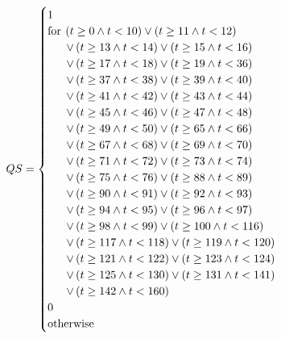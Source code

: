 \documentclass[10pt,journal]{IEEEtran}
\begin{document}
\begin{equation}
 \begin{minipage}{250pt}
\begin{flushleft} $\displaystyle QS = \begin{cases} 1 & \\  \text{for}\: \left(t \geq 0 \wedge t < 10\right) \vee \left(t \geq 11 \wedge t < 12 \right) \\ \quad \ \  \vee \left(t \geq 13 \wedge t < 14\right) \vee \left(t \geq 15 \wedge t < 16 \right) \\ \quad \ \  \vee \left(t \geq 17 \wedge t < 18\right) \vee \left(t \geq 19 \wedge t < 36\right) \\ \quad \ \  \vee \left(t \geq 37 \wedge t < 38\right) \vee \left(t \geq 39 \wedge t < 40\right) \\ \quad \ \  \vee \left(t \geq 41 \wedge t < 42\right) \vee \left(t \geq 43 \wedge t < 44\right) \\ \quad \ \  \vee \left(t \geq 45 \wedge t < 46\right) \vee \left(t \geq 47 \wedge t < 48\right) \\ \quad \ \  \vee \left(t \geq 49 \wedge t < 50\right) \vee \left(t \geq 65 \wedge t < 66 \right) \\ \quad \ \  \vee \left(t \geq 67 \wedge t < 68\right) \vee \left(t \geq 69 \wedge t < 70\right) \\ \quad \ \  \vee \left(t \geq 71 \wedge t < 72\right) \vee \left(t \geq 73 \wedge t < 74\right) \\ \quad \ \  \vee \left(t \geq 75 \wedge t < 76\right) \vee \left(t \geq 88 \wedge t < 89 \right) \\ \quad \ \  \vee \left(t \geq 90 \wedge t < 91\right) \vee \left(t \geq 92 \wedge t < 93\right) \\ \quad \ \  \vee \left(t \geq 94 \wedge t < 95\right) \vee \left(t \geq 96 \wedge t < 97\right) \\ \quad \ \  \vee \left(t \geq 98 \wedge t < 99\right) \vee \left(t \geq 100 \wedge t < 116\right) \\ \quad \ \  \vee \left(t \geq 117 \wedge t < 118\right) \vee \left(t \geq 119 \wedge t < 120 \right) \\ \quad \ \  \vee \left(t \geq 121 \wedge t < 122\right) \vee \left(t \geq 123 \wedge t < 124\right) \\ \quad \ \  \vee \left(t \geq 125 \wedge t < 130\right) \vee \left(t \geq 131 \wedge t < 141\right) \\ \quad \ \  \vee \left(t \geq 142 \wedge t < 160\right) \\0 & \\  \text{otherwise} \end{cases}$  \end{flushleft}
 \end{minipage}
 \end{equation}
\end{document}
